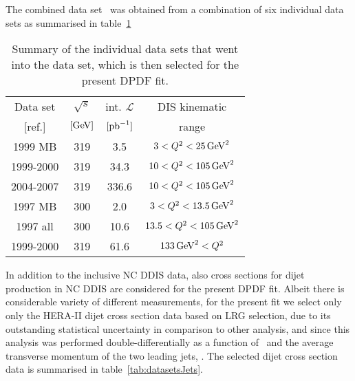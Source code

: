 \documentclass[12pt]{article}
\begin{document}
The combined data set \HIcomb\ was obtained from a combination of six individual data sets as summarised in table~\ref{tab:datasetsComb}
\begin{table}[tbhp]
  \footnotesize
  \begin{center}
    \begin{tabular}{cccc}
      \hline
      \multicolumn{1}{c}{Data set} & $\sqrt{s}$ & int. $\mathcal{L}$ & DIS kinematic  \\  
      \multicolumn{1}{c}{[ref.]}  & $[\mathrm{GeV}]$   & $[{\rm pb}^{-1}]$  &  range         \\   
      \hline
      1999 MB   & 319 & 3.5  & $3<Q^{2}<25\,\mathrm{GeV}^2$   \\
      1999-2000 & 319 & 34.3 & $10< Q^{2}<105\,\mathrm{GeV}^2 $   \\
      2004-2007 & 319 & 336.6 & $10< Q^{2}<105\,\mathrm{GeV}^2 $   \\
      \hline
      1997 MB   & 300 & 2.0 & $3<Q^{2}<13.5\,\mathrm{GeV}^2$   \\
      1997 all  & 300 & 10.6 & $13.5<Q^{2}<105\,\mathrm{GeV}^2$   \\
      1999-2000 & 319 & 61.6 & $133\,\mathrm{GeV}^2 < Q^{2} $   \\
      \hline
    \end{tabular}
    \caption{
      Summary of the individual data sets that went into the \HIcomb data set, which is then selected for the present DPDF fit.
    }
    \label{tab:datasetsComb}
    \end{center}
\end{table}

In addition to the inclusive NC DDIS data, also cross sections for dijet production in NC DDIS are considered for the present DPDF fit.
%
Albeit there is considerable variety of different measurements, for the present fit we select only only the HERA-II dijet cross section data based on LRG selection, due to its outstanding statistical uncertainty in comparison to other analysis, and since this analysis was performed double-differentially as a function of \Qsq\ and the average transverse momentum of the two leading jets, \meanpt.
The selected dijet cross section data is summarised in table~\ref{tab:datasetsJets}.
\end{document}

